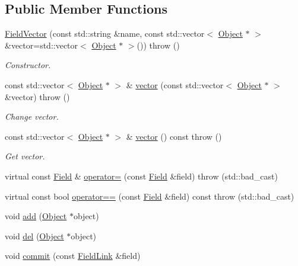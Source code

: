 \subsection*{Public Member Functions}
\begin{DoxyCompactItemize}
\item 
\hyperlink{classCore_1_1FieldVector_ae0a35cb365468b2434527ecff44bff9d}{FieldVector} (const std::string \&name, const std::vector$<$ \hyperlink{classCore_1_1Object}{Object} $\ast$ $>$ \&vector=std::vector$<$ \hyperlink{classCore_1_1Object}{Object} $\ast$ $>$())  throw ()
\begin{DoxyCompactList}\small\item\em Constructor. \item\end{DoxyCompactList}\item 
const std::vector$<$ \hyperlink{classCore_1_1Object}{Object} $\ast$ $>$ \& \hyperlink{classCore_1_1FieldVector_ae2855da313c104367b35b97eb98097dc}{vector} (const std::vector$<$ \hyperlink{classCore_1_1Object}{Object} $\ast$ $>$ \&vector)  throw ()
\begin{DoxyCompactList}\small\item\em Change vector. \item\end{DoxyCompactList}\item 
const std::vector$<$ \hyperlink{classCore_1_1Object}{Object} $\ast$ $>$ \& \hyperlink{classCore_1_1FieldVector_a75f050f282ad9848aceae2efbb9d72cd}{vector} () const   throw ()
\begin{DoxyCompactList}\small\item\em Get vector. \item\end{DoxyCompactList}\item 
virtual const \hyperlink{classCore_1_1Field}{Field} \& \hyperlink{classCore_1_1FieldVector_a8482c272e2bc4e5b09194b903bead7f7}{operator=} (const \hyperlink{classCore_1_1Field}{Field} \&field)  throw (std::bad\_\-cast)
\item 
virtual const bool \hyperlink{classCore_1_1FieldVector_a79df85b6378b5ce608ca579bd3e23027}{operator==} (const \hyperlink{classCore_1_1Field}{Field} \&field) const   throw (std::bad\_\-cast)
\item 
void \hyperlink{classCore_1_1FieldVector_ab99c7d1efa922626c965378513eea97c}{add} (\hyperlink{classCore_1_1Object}{Object} $\ast$object)
\item 
void \hyperlink{classCore_1_1FieldVector_a998eb9129eab985880411f7c564879d3}{del} (\hyperlink{classCore_1_1Object}{Object} $\ast$object)
\item 
void \hyperlink{classCore_1_1FieldVector_a62af016fcb50e445db4ad64123281106}{commit} (const \hyperlink{classCore_1_1FieldLink}{FieldLink} \&field)
\end{DoxyCompactItemize}


